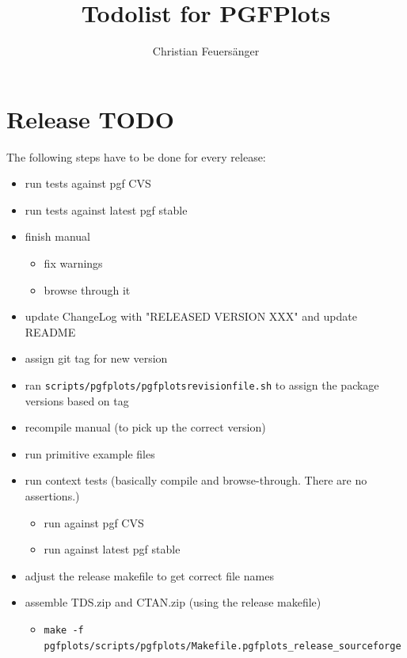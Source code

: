 \documentclass[a4paper]{article}
\author{Christian Feuers\"anger}
\title{Todolist for PGFPlots\\\texttt{\small\pgfplotscommandtostring\pgfplotsrevision\temp\temp}}
\begin{document}
\maketitle
\tableofcontents

\section{Release TODO}
The following steps have to be done for every release:

\begin{itemize}
	\item run tests against pgf CVS
	\item run tests against latest pgf stable
	\item finish manual
		\begin{itemize}
			\item fix warnings
			\item browse through it
		\end{itemize}
	\item update ChangeLog with "RELEASED VERSION XXX" and update README
	\item assign git tag for new version
	\item ran \verb|scripts/pgfplots/pgfplotsrevisionfile.sh| to assign the package versions based on tag
	\item recompile manual (to pick up the correct version)
	\item run primitive example files
	\item run context tests (basically compile and browse-through. There are no assertions.)
		\begin{itemize}
			\item run against pgf CVS
			\item run against latest pgf stable
		\end{itemize}
	\item adjust the release makefile to get correct file names
	\item assemble TDS.zip and CTAN.zip (using the release makefile)
		\begin{itemize}
			\item \verb|make -f pgfplots/scripts/pgfplots/Makefile.pgfplots_release_sourceforge |


\end{itemize}
\end{itemize}
\end{document}
